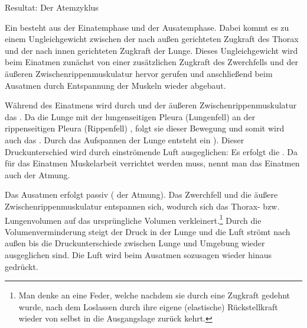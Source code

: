 \TextSlide
{Resultat: Der Atemzyklus}%
{%
Ein  besteht aus der Einatemphase und der
Ausatemphase. Dabei kommt es zu einem Ungleichgewicht
zwischen der nach außen gerichteten Zugkraft des Thorax und
der nach innen gerichteten Zugkraft der Lunge. Dieses
Ungleichgewicht wird beim Einatmen zunächst von einer
zusätzlichen Zugkraft des Zwerchfells und der äußeren
Zwischenrippenmuskulatur hervor gerufen und anschließend
beim Ausatmen durch Entspannung der Muskeln wieder abgebaut.
  
Während des Einatmens wird durch  
und der äußeren Zwischenrippenmuskulatur das
.
%
Da die Lunge mit der lungenseitigen Pleura (Lungenfell)
an der rippenseitigen Pleura (Rippenfell) ,
folgt sie dieser Bewegung 
und somit wird auch das .
%
Durch das Aufspannen der Lunge entsteht ein ). 
%
Dieser Druckunterschied wird durch einströmende Luft ausgeglichen:
%
Es erfolgt die .
%
Da für das Einatmen Muskelarbeit verrichtet werden muss,
nennt man das Einatmen auch  der Atmung.
  
Das Ausatmen erfolgt passiv ( der Atmung).
Das Zwerchfell und die äußere Zwischenrippenmuskulatur
entspannen sich, 
wodurch sich das Thorax- bzw. Lungenvolumen auf das ursprüngliche Volumen
verkleinert.\footnote{Man denke an eine Feder, welche
nachdem sie durch eine Zugkraft gedehnt wurde, nach dem
Loslassen durch ihre eigene (elastische) Rückstellkraft
wieder von selbst in die Ausgangslage zurück kehrt.} Durch
die Volumenverminderung steigt der Druck in der Lunge und
die Luft strömt nach außen bis die Druckunterschiede
zwischen Lunge und Umgebung wieder ausgeglichen sind. Die
Luft wird beim Ausatmen sozusagen wieder hinaus gedrückt.
  
}
